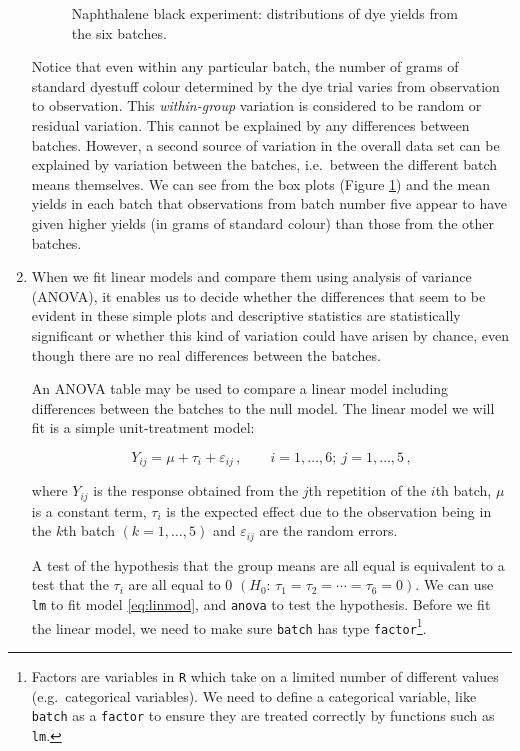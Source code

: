 \documentclass[
]{book}
\theoremstyle{definition}
\theoremstyle{definition}
\theoremstyle{definition}
\theoremstyle{definition}
\theoremstyle{remark}
\begin{document}
\begin{enumerate}
\begin{figure}
{   }

   \caption{Naphthalene black experiment: distributions of dye yields from the six batches.}\label{fig:napblack-summary}
   \end{figure}

  Notice that even within any particular batch, the number of grams of standard dyestuff colour determined by the dye trial varies from observation to observation. This \emph{within-group} variation is considered to be random or residual variation. This cannot be explained by any differences between batches. However, a second source of variation in the overall data set can be explained by variation between the batches, i.e.~between the different batch means themselves. We can see from the box plots (Figure \ref{fig:napblack-summary}) and the mean yields in each batch that observations from batch number five appear to have given higher yields (in grams of standard colour) than those from the other batches.
\item
  When we fit linear models and compare them using analysis of variance (ANOVA), it enables us to decide whether the differences that seem to be evident in these simple plots and descriptive statistics are statistically significant or whether this kind of variation could have arisen by chance, even though there are no real differences between the batches.

  An ANOVA table may be used to compare a linear model including differences between the batches to the null model. The linear model we will fit is a simple unit-treatment model:

  \begin{equation}
   Y_{ij} =  \mu +  \tau_i +  \varepsilon_{ij} \,,\qquad i=1,\ldots,6;~j=1,\ldots,5\,,
   \label{eq:linmod}
   \end{equation}

  where \(Y_{ij}\) is the response obtained from the \(j\)th repetition of the \(i\)th batch, \(\mu\) is a constant term, \(\tau_i\) is the expected effect due to the observation being in the \(k\)th batch \((k=1,\ldots,5)\) and \(\varepsilon_{ij}\) are the random errors.

  A test of the hypothesis that the group means are all equal is equivalent to a test that the \(\tau_i\) are all equal to 0 \((H_0:\, \tau_1 = \tau_2 = \cdots = \tau_6 = 0)\). We can use \texttt{lm} to fit model \eqref{eq:linmod}, and \texttt{anova} to test the hypothesis. Before we fit the linear model, we need to make sure \texttt{batch} has type \texttt{factor}\footnote{Factors are variables in \texttt{R} which take on a limited number of different values (e.g.~categorical variables). We need to define a categorical variable, like \texttt{batch} as a \texttt{factor} to ensure they are treated correctly by functions such as \texttt{lm}.}.


\end{enumerate}
\end{document}
